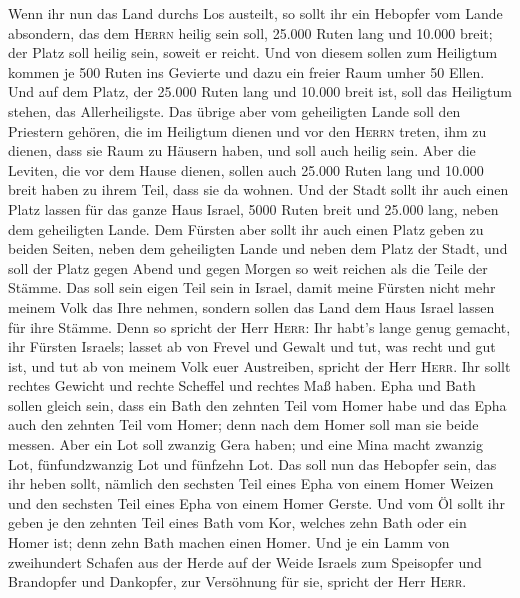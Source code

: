  Wenn ihr nun das Land durchs Los austeilt, so sollt ihr
ein Hebopfer vom Lande absondern, das dem \textsc{Herrn} heilig sein
soll, 25.000 Ruten lang und 10.000 breit; der Platz soll heilig sein,
soweit er reicht.  Und von diesem sollen zum Heiligtum
kommen je 500 Ruten ins Gevierte und dazu ein freier Raum umher 50
Ellen.  Und auf dem Platz, der 25.000 Ruten lang und
10.000 breit ist, soll das Heiligtum stehen, das Allerheiligste.
 Das übrige aber vom geheiligten Lande soll den Priestern
gehören, die im Heiligtum dienen und vor den \textsc{Herrn} treten, ihm
zu dienen, dass sie Raum zu Häusern haben, und soll auch heilig sein.
 Aber die Leviten, die vor dem Hause dienen, sollen auch
25.000 Ruten lang und 10.000 breit haben zu ihrem Teil, dass sie da
wohnen.  Und der Stadt sollt ihr auch einen Platz lassen
für das ganze Haus Israel, 5000 Ruten breit und 25.000 lang, neben dem
geheiligten Lande.  Dem Fürsten aber sollt ihr auch einen
Platz geben zu beiden Seiten, neben dem geheiligten Lande und neben dem
Platz der Stadt, und soll der Platz gegen Abend und gegen Morgen so weit
reichen als die Teile der Stämme.  Das soll sein eigen
Teil sein in Israel, damit meine Fürsten nicht mehr meinem Volk das Ihre
nehmen, sondern sollen das Land dem Haus Israel lassen für ihre Stämme.
 Denn so spricht der Herr \textsc{Herr}: Ihr habt's lange
genug gemacht, ihr Fürsten Israels; lasset ab von Frevel und Gewalt und
tut, was recht und gut ist, und tut ab von meinem Volk euer Austreiben,
spricht der Herr \textsc{Herr}.  Ihr sollt rechtes
Gewicht und rechte Scheffel und rechtes Maß haben.  Epha
und Bath sollen gleich sein, dass ein Bath den zehnten Teil vom Homer
habe und das Epha auch den zehnten Teil vom Homer; denn nach dem Homer
soll man sie beide messen.  Aber ein Lot soll zwanzig
Gera haben; und eine Mina macht zwanzig Lot, fünfundzwanzig Lot und
fünfzehn Lot.  Das soll nun das Hebopfer sein, das ihr
heben sollt, nämlich den sechsten Teil eines Epha von einem Homer Weizen
und den sechsten Teil eines Epha von einem Homer Gerste. 
Und vom Öl sollt ihr geben je den zehnten Teil eines Bath vom Kor,
welches zehn Bath oder ein Homer ist; denn zehn Bath machen einen Homer.
 Und je ein Lamm von zweihundert Schafen aus der Herde
auf der Weide Israels zum Speisopfer und Brandopfer und Dankopfer, zur
Versöhnung für sie, spricht der Herr \textsc{Herr}. 
